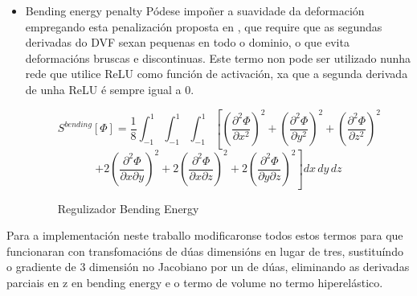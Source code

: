 \begin{itemize}
    \item Bending energy penalty
    Pódese impoñer a suavidade da deformación empregando esta penalización proposta en \cite{bendingenergy}, que 
    require que as segundas derivadas do DVF sexan pequenas en todo o dominio, o que evita deformacións bruscas e discontinuas.
    Este termo non pode ser utilizado nunha rede que utilice ReLU como función de activación, xa que a segunda derivada de unha ReLU é sempre igual a 0.

    \begin{figure}[tbp]
        \centering
        \[
        S^{bending}[\Phi] = \frac{1}{8} \int_{-1}^{1} \int_{-1}^{1} \int_{-1}^{1} \left[ \left( \frac{\partial^2 \Phi}{\partial x^2} \right)^2 + \left( \frac{\partial^2 \Phi}{\partial y^2} \right)^2 + \left( \frac{\partial^2 \Phi}{\partial z^2} \right)^2 \right.
        \]
        \[
        \left. + 2 \left( \frac{\partial^2 \Phi}{\partial x \partial y} \right)^2 + 2 \left( \frac{\partial^2 \Phi}{\partial x \partial z} \right)^2 + 2 \left( \frac{\partial^2 \Phi}{\partial y \partial z} \right)^2 \right] dx\,dy\,dz
        \]
        \caption{Regulizador Bending Energy}
    \end{figure}
    
\end{itemize}

Para a implementación neste traballo modificaronse todos estos termos para que funcionaran con transfomacións de dúas dimensións en lugar de tres,
 sustituíndo o gradiente de 3 dimensión no Jacobiano por un de dúas, eliminando as derivadas parciais en z en bending energy e o termo de volume no termo hiperelástico.

